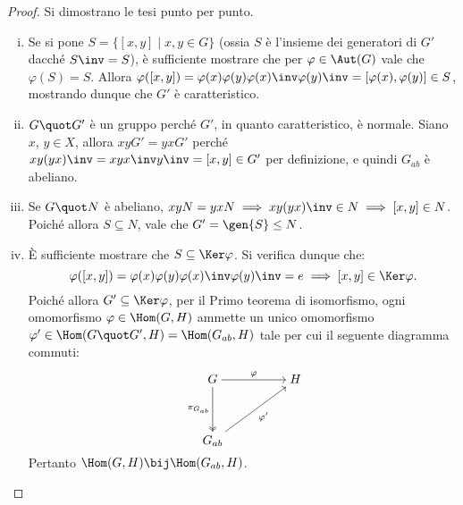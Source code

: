 \documentclass[12pt]{scrartcl}
\begin{document}
	\begin{proof}
		Si dimostrano le tesi punto per punto.
		
		\begin{enumerate}[(i)]
			\item Se si pone $S = \{ [x, y] \mid x, y \in G \}$ (ossia $S$ è l'insieme dei
				generatori di $G'$ dacché $S\inv = S$), è sufficiente mostrare che per $\varphi \in \Aut(G)$
				vale che $\varphi(S) = S$. Allora $\varphi([x, y]) = \varphi(x) \varphi(y)
				\varphi(x)\inv \varphi(y)\inv = [\varphi(x), \varphi(y)] \in S$, mostrando
				dunque che $G'$ è caratteristico.
			\item $G \quot G'$ è un gruppo perché $G'$, in quanto caratteristico, è
				normale. Siano $x$, $y \in X$, allora $xyG' = yxG'$ perché
				$xy(yx)\inv = xyx\inv y \inv = [x, y] \in G'$ per definizione, e quindi
				$G_{ab}$ è abeliano.
			\item Se $G \quot N$ è abeliano, $xyN = yxN \implies xy(yx)\inv \in N \implies
				[x, y] \in N$. Poiché allora $S \subseteq N$, vale che $G' = \gen{S} \leq N$.
			\item È sufficiente mostrare che $S \subseteq \Ker \varphi$. Si verifica dunque
				che:
				\[ \varphi([x, y]) = \varphi(x) \varphi(y) \varphi(x)\inv \varphi(y)\inv
				= e \implies [x, y] \in \Ker \varphi. \]
				Poiché allora $G' \subseteq \Ker \varphi$, per il Primo teorema di isomorfismo,
				ogni omomorfismo $\varphi \in \Hom(G, H)$ ammette un unico omomorfismo
				$\varphi' \in \Hom(G \quot G', H) = \Hom(G_{ab}, H)$ tale per cui il seguente
				diagramma commuti:
				\[\begin{tikzcd}[cramped]
					G && H \\
					\\
					{G_{ab}}
					\arrow["\varphi", from=1-1, to=1-3]
					\arrow["{\pi_{G_{ab}}}"', two heads, from=1-1, to=3-1]
					\arrow["{\varphi'}"', from=3-1, to=1-3]
				\end{tikzcd}\]
				Pertanto $\Hom(G, H) \bij \Hom(G_{ab}, H)$.
		\end{enumerate}
	\end{proof}
\end{document}
